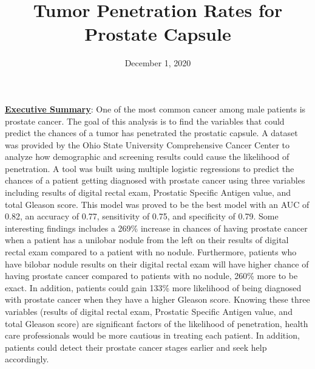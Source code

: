 \documentclass[11pt]{article}\usepackage[]{graphicx}\usepackage[]{color}
\title{Tumor Penetration Rates for Prostate Capsule\vspace{-5ex}}
\date{December 1, 2020\vspace{-5ex}}
\begin{document}
 
\maketitle
\hfill \break


















\noindent\textbf{\underline{Executive Summary}}: One of the most common cancer among male patients is prostate cancer. The goal of this analysis is to find the variables that could predict the chances of a tumor has penetrated the prostatic capsule. A dataset was provided by the Ohio State University Comprehensive Cancer Center to analyze how demographic and screening results could cause the likelihood of penetration. A tool was built using multiple logistic regressions to predict the chances of a patient getting diagnosed with prostate cancer using three variables including results of digital rectal exam, Prostatic Specific Antigen value, and total Gleason score. This model was proved to be the best model with an AUC of 0.82, an accuracy of 0.77, sensitivity of 0.75, and specificity of 0.79. Some interesting findings includes a 269\% increase in chances of having prostate cancer when a patient has a unilobar nodule from the left on their results of digital rectal exam compared to a patient with no nodule. Furthermore, patients who have bilobar nodule results on their digital rectal exam will have higher chance of having prostate cancer compared to patients with no nodule, 260\% more to be exact. In addition, patients could gain 133\% more likelihood of being diagnosed with prostate cancer when they have a higher Gleason score. Knowing these three variables (results of digital rectal exam, Prostatic Specific Antigen value, and total Gleason score) are significant factors of the likelihood of penetration, health care professionals would be more cautious in treating each patient. In addition, patients could detect their prostate cancer stages earlier and seek help accordingly.      
\hfill \break
\end{document}
